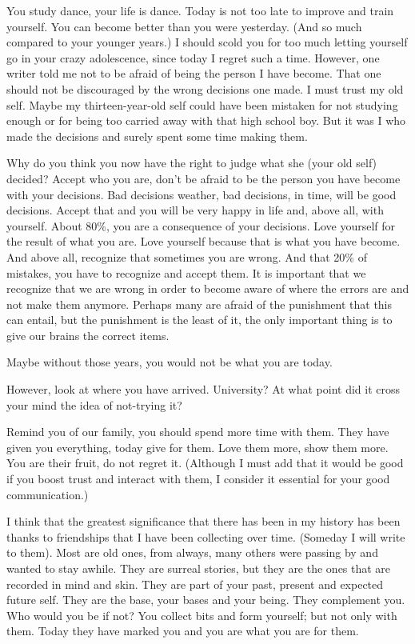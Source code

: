 \documentclass[]{book}
\begin{document}
You study dance, your life is dance. Today is not too late to improve and train yourself. You can become better than you were yesterday. (And so much compared to your younger years.) I should scold you for too much letting yourself go in your crazy adolescence, since today I regret such a time. However, one writer told me not to be afraid of being the person I have become. That one should not be discouraged by the wrong decisions one made. I must trust my old self. Maybe my thirteen-year-old self could have been mistaken for not studying enough or for being too carried away with that high school boy. But it was I who made the decisions and surely spent some time making them.

Why do you think you now have the right to judge what she (your old self) decided? Accept who you are, don't be afraid to be the person you have become with your decisions. Bad decisions weather, bad decisions, in time, will be good decisions. Accept that and you will be very happy in life and, above all, with yourself. About 80\%, you are a consequence of your decisions. Love yourself for the result of what you are. Love yourself because that is what you have become. And above all, recognize that sometimes you are wrong. And that 20\% of mistakes, you have to recognize and accept them. It is important that we recognize that we are wrong in order to become aware of where the errors are and not make them anymore. Perhaps many are afraid of the punishment that this can entail, but the punishment is the least of it, the only important thing is to give our brains the correct items.

Maybe without those years, you would not be what you are today.

However, look at where you have arrived. University? At what point did it cross your mind the idea of not-trying it?

Remind you of our family, you should spend more time with them. They have given you everything, today give for them. Love them more, show them more. You are their fruit, do not regret it. (Although I must add that it would be good if you boost trust and interact with them, I consider it essential for your good communication.)

I think that the greatest significance that there has been in my history has been thanks to friendships that I have been collecting over time. (Someday I will write to them). Most are old ones, from always, many others were passing by and wanted to stay awhile. They are surreal stories, but they are the ones that are recorded in mind and skin. They are part of your past, present and expected future self. They are the base, your bases and your being. They complement you. Who would you be if not? You collect bits and form yourself; but not only with them. Today they have marked you and you are what you are for them.
\end{document}
